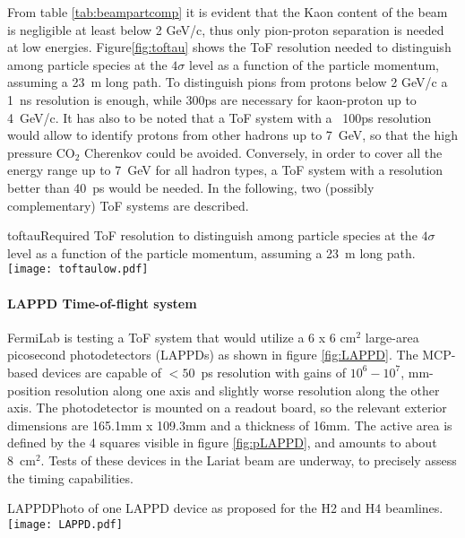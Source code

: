   From table \ref{tab:beampartcomp} it is evident that the Kaon content of the beam is negligible at least below 2 GeV/c, thus  only pion-proton separation is needed at low energies. Figure\ref{fig:toftau} shows the ToF resolution needed to distinguish among particle species at the $4\sigma$ level as a function of the particle momentum, assuming a 23~m long path. To distinguish pions from protons below 2 GeV/c a 1~ns resolution is enough, while 300ps are necessary for kaon-proton up to  4~GeV/c. It has also to be noted that a ToF system with a ~100ps resolution would allow to identify protons from other hadrons up to 7~GeV, so that the high pressure CO$_2$ Cherenkov could be avoided. Conversely, in order to cover all the energy range up to 7~GeV for all hadron  types, a ToF system with a resolution better than 40~ps would be needed.
In the following, two (possibly complementary) ToF systems are described.
\begin{cdrfigure}{toftau}{Required ToF resolution to  distinguish among particle species at the $4\sigma$ level as a function of the particle momentum, assuming a 23~m long path. }
\texttt{[image: toftaulow.pdf]}
\end{cdrfigure}

\paragraph{LAPPD Time-of-flight system}
FermiLab is testing a ToF system that would utilize a 6 x 6 cm$^2$
large-area picosecond photodetectors (LAPPDs) as shown in figure \ref{fig:LAPPD}.
 The MCP-based devices
are capable of $< 50$~ps resolution with gains of $10^6-10^7$,
mm-position resolution along one axis and slightly worse resolution
along the other axis.  The photodetector is mounted on a readout
board, so the relevant exterior dimensions are 165.1mm x 109.3mm and a
thickness of 16mm. The active area is defined by the 4 squares visible in figure \ref{fig:pLAPPD}, and amounts to about 8~cm$^2$. Tests of these devices in the Lariat beam are underway, to precisely assess the timing capabilities.
\begin{cdrfigure}[LAPPD]{LAPPD}{Photo of one LAPPD device as proposed for the H2 and H4 beamlines.}
\texttt{[image: LAPPD.pdf]}
\end{cdrfigure}

